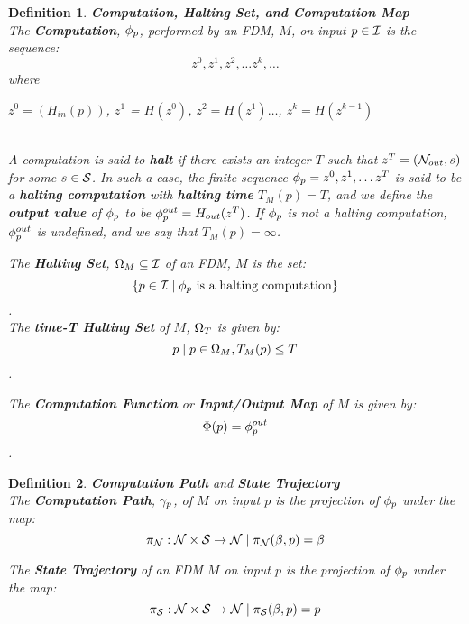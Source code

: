 \documentclass[twoside]{article}
\newtheorem{definition}{Definition}[section]
\begin{document}
\begin{definition}{\textbf{Computation, Halting Set, and Computation Map}}\\
  
  The \textbf{Computation}, $\phi_p$, performed by an FDM, $M$,
  on input $p \in \mathcal{I}$ is the sequence: 
  $$z^0, z^1, z^2, \ldots z^k, \ldots$$ 
  where\\ 
  \centerline{$z^0 = (H_{in}(p))$, $z^1$ = $H(z^0)$, $z^2 = H(z^1) \ldots$, $z^k = H(z^{k-1})$}\\

  A computation is said to \textbf{halt} if there exists an integer
  $T$ such that $z^T = (\mathcal{N}_{out}, s)$ for some $s \in \mathcal{S}$.
  In such a case, the finite sequence $\phi_p = z^0, z^1, \ldots
  z^T$ is said to be a \textbf{halting computation} with
  \textbf{halting time} $T_M(p) = T$, and we define the \textbf{output
    value} of $\phi_p$ to be $\phi_{p}^{out} = H_{out}(z^T)$.  If
  $\phi_p$ is not a halting computation, $\phi_{p}^{out}$ is
  undefined, and we say that $T_M(p) = \infty$.\\
  

  The \textbf{Halting Set}, $\Omega_M \subseteq \mathcal{I}$ of an FDM,
  $M$ is the set: 
  $$\{p \in \mathcal{I} \mid \phi_p \text{ is a halting computation}\}$$.\\
  \noindent The \textbf{time-T Halting Set} of $M$, $\Omega_T$ is given by:
  $$p \mid p \in \Omega_M, T_M(p) \leq T$$.
  
  The \textbf{Computation Function} or \textbf{Input/Output Map} of
  $M$  is given by:
  $$\Phi(p) = \phi_{p}^{out}$$.
\end{definition}
\begin{definition}{\textbf{Computation Path} and \textbf{State Trajectory}}\\
  
  The \textbf{Computation Path}, $\gamma_p$, of $M$ on
  input $p$ is the projection of $\phi_p$ under the map:
  $$\pi_{\mathcal{N}}:\mathcal{N} \times \mathcal{S} \rightarrow \mathcal{N} \mid \pi_{\mathcal{N}}(\beta, p) = \beta$$
  
  The \textbf{State Trajectory} of an FDM $M$ on input $p$ is the
  projection of $\phi_p$ under the map:
  $$\pi_{\mathcal{S}}:\mathcal{N} \times \mathcal{S} \rightarrow \mathcal{N} \mid \pi_{\mathcal{S}}(\beta, p) = p$$
\end{definition}
\end{document}
